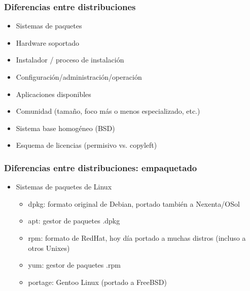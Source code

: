 \documentclass{beamer}
\begin{document}
\begin{frame}
\frametitle{Diferencias entre distribuciones}

\begin{itemize}

\item Sistemas de paquetes
\item Hardware soportado
\item Instalador / proceso de instalación
\item Configuración/administración/operación
\item Aplicaciones disponibles
\item Comunidad (tamaño, foco más o menos especializado, etc.)
\item Sistema base homogéneo (BSD) 
\item Esquema de licencias (permisivo vs. copyleft)

\end{itemize}

\end{frame}


\begin{frame}
\frametitle{Diferencias entre distribuciones: empaquetado}

\begin{itemize}

\item Sistemas de paquetes de Linux
	\begin{itemize}
	\item \alert{dpkg}: formato original de Debian, portado también a Nexenta/OSol
	\item \alert{apt}: gestor de paquetes .dpkg
	\item \alert{rpm}: formato de RedHat, hoy día portado a muchas distros (incluso a otros Unixes) 
	\item \alert{yum}: gestor de paquetes .rpm
	\item \alert{portage}: Gentoo Linux (portado a FreeBSD)
	\end{itemize}
\end{itemize}

\end{frame}


\end{document}
